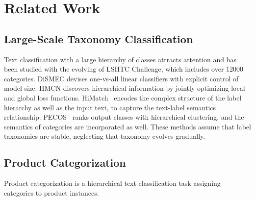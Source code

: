 \section{Related Work} 
\subsection{Large-Scale Taxonomy Classification} 
Text classification with a large hierarchy of classes attracts attention and has been studied with the evolving of LSHTC \cite{partalas2015lshtc} Challenge, which includes 
over 12000 categories. DiSMEC \cite{babbar2017dismec} devises one-vs-all linear classifiers 
with explicit control of model size. 
HMCN \cite{wehrmann2018hierarchical} discovers hierarchical information by jointly optimizing local and global loss functions.
HiMatch~\cite{chen2021hierarchy} encodes the complex structure of the label hierarchy as well as the input text, to capture the text-label semantics relationship. 
PECOS~\cite{yu2020pecos} ranks output classes with hierarchical clustering, and the semantics of categories are incorporated as well.
These methods assume that label taxonomies are stable, neglecting that 
taxonomy evolves gradually. 

\subsection{Product Categorization}
Product categorization is a hierarchical text classification task assigning categories to product instances. 

